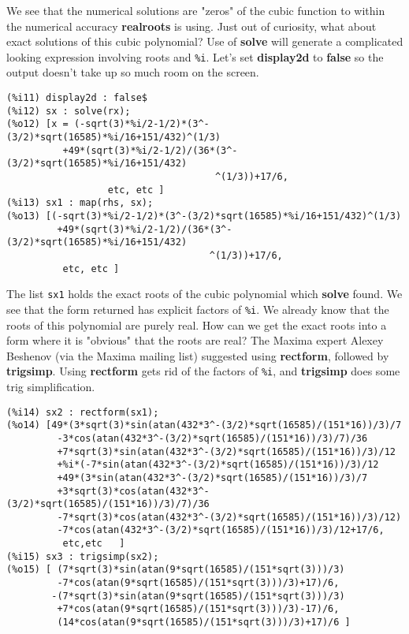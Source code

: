 \documentclass[12pt]{article}
\begin{document}
\normalsize
We see that the numerical solutions are "zeros" of the cubic function to within
  the numerical accuracy \textbf{realroots} is using.
Just out of curiosity, what about exact solutions of this cubic polynomial?
Use of \textbf{solve} will generate a complicated looking expression involving
  roots and \verb|%i|.
Let's set \textbf{display2d} to \textbf{false} so the output doesn't take up so much
  room on the screen.
\small
\begin{verbatim}
(%i11) display2d : false$
(%i12) sx : solve(rx);
(%o12) [x = (-sqrt(3)*%i/2-1/2)*(3^-(3/2)*sqrt(16585)*%i/16+151/432)^(1/3)
          +49*(sqrt(3)*%i/2-1/2)/(36*(3^-(3/2)*sqrt(16585)*%i/16+151/432)
                                     ^(1/3))+17/6,
                  etc, etc ]
(%i13) sx1 : map(rhs, sx);
(%o13) [(-sqrt(3)*%i/2-1/2)*(3^-(3/2)*sqrt(16585)*%i/16+151/432)^(1/3)
         +49*(sqrt(3)*%i/2-1/2)/(36*(3^-(3/2)*sqrt(16585)*%i/16+151/432)
                                    ^(1/3))+17/6,
          etc, etc ]
\end{verbatim}
\normalsize
The list \verb|sx1| holds the exact roots of the cubic polynomial which
  \textbf{solve} found.
We see that the form returned has explicit factors of \verb|%i|.
We already know that the roots of this polynomial are purely real.
How can we get the exact roots into a form where it is "obvious" that
  the roots are real?
The Maxima expert Alexey Beshenov (via the Maxima mailing list) suggested
  using \textbf{rectform}, followed by \textbf{trigsimp}.
Using \textbf{rectform} gets rid of the factors of \verb|%i|, and
  \textbf{trigsimp} does some trig simplification. 
\small
\begin{verbatim}
(%i14) sx2 : rectform(sx1);
(%o14) [49*(3*sqrt(3)*sin(atan(432*3^-(3/2)*sqrt(16585)/(151*16))/3)/7
         -3*cos(atan(432*3^-(3/2)*sqrt(16585)/(151*16))/3)/7)/36
         +7*sqrt(3)*sin(atan(432*3^-(3/2)*sqrt(16585)/(151*16))/3)/12
         +%i*(-7*sin(atan(432*3^-(3/2)*sqrt(16585)/(151*16))/3)/12
         +49*(3*sin(atan(432*3^-(3/2)*sqrt(16585)/(151*16))/3)/7
         +3*sqrt(3)*cos(atan(432*3^-(3/2)*sqrt(16585)/(151*16))/3)/7)/36
		 -7*sqrt(3)*cos(atan(432*3^-(3/2)*sqrt(16585)/(151*16))/3)/12)
         -7*cos(atan(432*3^-(3/2)*sqrt(16585)/(151*16))/3)/12+17/6,
          etc,etc   ]
(%i15) sx3 : trigsimp(sx2);
(%o15) [ (7*sqrt(3)*sin(atan(9*sqrt(16585)/(151*sqrt(3)))/3)
         -7*cos(atan(9*sqrt(16585)/(151*sqrt(3)))/3)+17)/6,
        -(7*sqrt(3)*sin(atan(9*sqrt(16585)/(151*sqrt(3)))/3)
         +7*cos(atan(9*sqrt(16585)/(151*sqrt(3)))/3)-17)/6,
		 (14*cos(atan(9*sqrt(16585)/(151*sqrt(3)))/3)+17)/6 ]
\end{verbatim}
\end{document}
